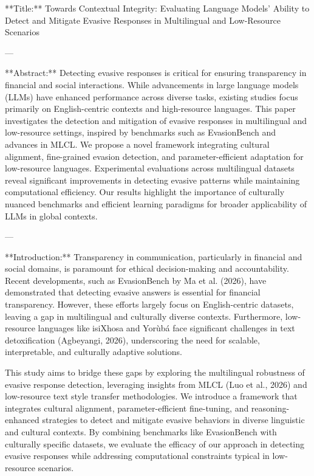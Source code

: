 **Title:** Towards Contextual Integrity: Evaluating Language Models’ Ability to Detect and Mitigate Evasive Responses in Multilingual and Low-Resource Scenarios  

---

**Abstract:**  
Detecting evasive responses is critical for ensuring transparency in financial and social interactions. While advancements in large language models (LLMs) have enhanced performance across diverse tasks, existing studies focus primarily on English-centric contexts and high-resource languages. This paper investigates the detection and mitigation of evasive responses in multilingual and low-resource settings, inspired by benchmarks such as EvasionBench and advances in MLCL. We propose a novel framework integrating cultural alignment, fine-grained evasion detection, and parameter-efficient adaptation for low-resource languages. Experimental evaluations across multilingual datasets reveal significant improvements in detecting evasive patterns while maintaining computational efficiency. Our results highlight the importance of culturally nuanced benchmarks and efficient learning paradigms for broader applicability of LLMs in global contexts.

---

**Introduction:**  
Transparency in communication, particularly in financial and social domains, is paramount for ethical decision-making and accountability. Recent developments, such as EvasionBench by Ma et al. (2026), have demonstrated that detecting evasive answers is essential for financial transparency. However, these efforts largely focus on English-centric datasets, leaving a gap in multilingual and culturally diverse contexts. Furthermore, low-resource languages like isiXhosa and Yorùbá face significant challenges in text detoxification (Agbeyangi, 2026), underscoring the need for scalable, interpretable, and culturally adaptive solutions.

This study aims to bridge these gaps by exploring the multilingual robustness of evasive response detection, leveraging insights from MLCL (Luo et al., 2026) and low-resource text style transfer methodologies. We introduce a framework that integrates cultural alignment, parameter-efficient fine-tuning, and reasoning-enhanced strategies to detect and mitigate evasive behaviors in diverse linguistic and cultural contexts. By combining benchmarks like EvasionBench with culturally specific datasets, we evaluate the efficacy of our approach in detecting evasive responses while addressing computational constraints typical in low-resource scenarios.

